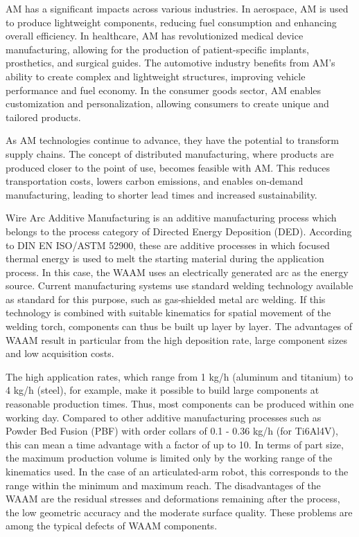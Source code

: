 AM has a significant impacts across various industries. In aerospace, AM is used to produce lightweight components, reducing fuel consumption and enhancing overall efficiency. In healthcare, AM has revolutionized medical device manufacturing, allowing for the production of patient-specific implants, prosthetics, and surgical guides. The automotive industry benefits from AM's ability to create complex and lightweight structures, improving vehicle performance and fuel economy. In the consumer goods sector, AM enables customization and personalization, allowing consumers to create unique and tailored products.

As AM technologies continue to advance, they have the potential to transform supply chains. The concept of distributed manufacturing, where products are produced closer to the point of use, becomes feasible with AM. This reduces transportation costs, lowers carbon emissions, and enables on-demand manufacturing, leading to shorter lead times and increased sustainability.

Wire Arc Additive Manufacturing is an additive manufacturing process which belongs to the process category of Directed Energy Deposition (DED). According to DIN EN ISO/ASTM 52900, these are additive processes in which focused thermal energy is used to melt the starting material during the application process. In this case, the WAAM uses an electrically generated arc as the energy source. Current manufacturing systems use standard welding technology available as standard for this purpose, such as gas-shielded metal arc welding. If this technology is combined with suitable kinematics for spatial movement of the welding torch, components can thus be built up layer by layer. The advantages of WAAM result in particular from the high deposition rate, large component sizes and low acquisition costs.

The high application rates, which range from 1 kg/h (aluminum and titanium) to 4 kg/h (steel), for example, make it possible to build large components at reasonable production times. Thus, most components can be produced within one working day. Compared to other additive manufacturing processes such as Powder Bed Fusion (PBF) with order collars of 0.1 - 0.36 kg/h (for Ti6Al4V), this can mean a time advantage with a factor of up to 10. In terms of part size, the maximum production volume is limited only by the working range of the kinematics used. In the case of an articulated-arm robot, this corresponds to the range within the minimum and maximum reach. The disadvantages of the WAAM are the residual stresses and deformations remaining after the process, the low geometric accuracy and the moderate surface quality. These problems are among the typical defects of WAAM components.


